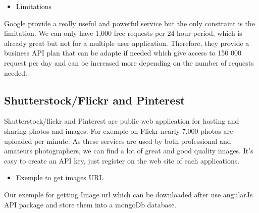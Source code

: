 \begin{itemize}
    \item {Limitations}
\end{itemize}

Google provide a really useful and powerful service but the only constraint is the limitation. We can only have 1,000 free requests per 24 hour period, which is already great but not for a multiple user application.
Therefore, they provide a business API plan that can be adapte if needed which give access to 150 000 request per day and can be increased more depending on the number of requests needed.

\subsection{Shutterstock/Flickr and Pinterest}

Shutterstock/flickr and Pinterest are public web application for hosting and sharing photos and images. For exemple on Flickr nearly 7,000 photos are uploaded per minute.
As these services are used by both professional and amateurs photographers, we can find a lot of great and good quality images.
It's easy to create an API key, just register on the web site of each applications.


\begin{itemize}
    \item {Exemple to get images URL}
\end{itemize}
Our exemple for getting Image url which can be downloaded after use angularJs API package and store them into a mongoDb database.

